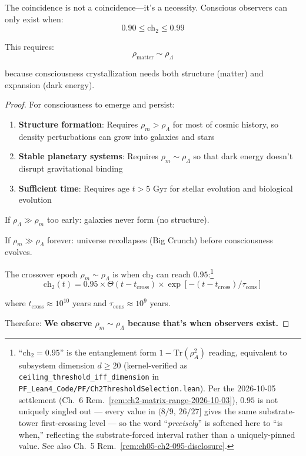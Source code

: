 \begin{theorem}\label{thm:coincidence-resolution}
The coincidence is not a coincidence—it's a necessity. Conscious observers can only exist when:
\begin{equation}
0.90 \leq \text{ch}_2 \leq 0.99
\end{equation}

This requires:
\begin{equation}
\rho_{\text{matter}} \sim \rho_\Lambda
\end{equation}

because consciousness crystallization needs both structure (matter) and expansion (dark energy).
\end{theorem}

\begin{proof}
For consciousness to emerge and persist:
\begin{enumerate}
\item \textbf{Structure formation}: Requires $\rho_m > \rho_\Lambda$ for most of cosmic history, so density perturbations can grow into galaxies and stars
\item \textbf{Stable planetary systems}: Requires $\rho_m \sim \rho_\Lambda$ so that dark energy doesn't disrupt gravitational binding
\item \textbf{Sufficient time}: Requires age $t > 5$ Gyr for stellar evolution and biological evolution
\end{enumerate}

If $\rho_\Lambda \gg \rho_m$ too early: galaxies never form (no structure).

If $\rho_m \gg \rho_\Lambda$ forever: universe recollapses (Big Crunch) before consciousness evolves.

The crossover epoch $\rho_m \sim \rho_\Lambda$ is when ch$_2$ can reach
$0.95$:\footnote{``$\mathrm{ch}_2 = 0.95$'' is the entanglement form
$1 - \mathrm{Tr}(\rho_A^2)$ reading, equivalent to subsystem dimension
$d \geq 20$ (kernel-verified as \texttt{ceiling\_threshold\_iff\_dimension}
in \texttt{PF\_Lean4\_Code/PF/Ch2ThresholdSelection.lean}). Per the
2026-10-05 settlement (Ch.~6 Rem.~\ref{rem:ch2-matrix-range-2026-10-03}),
$0.95$ is not uniquely singled out --- every value in $(8/9,\,26/27]$ gives
the same substrate-tower first-crossing level --- so the word
``\emph{precisely}'' is softened here to ``is when,'' reflecting the
substrate-forced interval rather than a uniquely-pinned value.
See also Ch.~5 Rem.~\ref{rem:ch05-ch2-095-disclosure}.}
\begin{equation}
\text{ch}_2(t) = 0.95 \times \Theta(t - t_{\text{cross}}) \times \exp[-(t - t_{\text{cross}})/\tau_{\text{cons}}]
\end{equation}

where $t_{\text{cross}} \approx 10^{10}$ years and $\tau_{\text{cons}} \approx 10^9$ years.

Therefore: \textbf{We observe $\rho_m \sim \rho_\Lambda$ because that's when observers exist.}
\end{proof}

